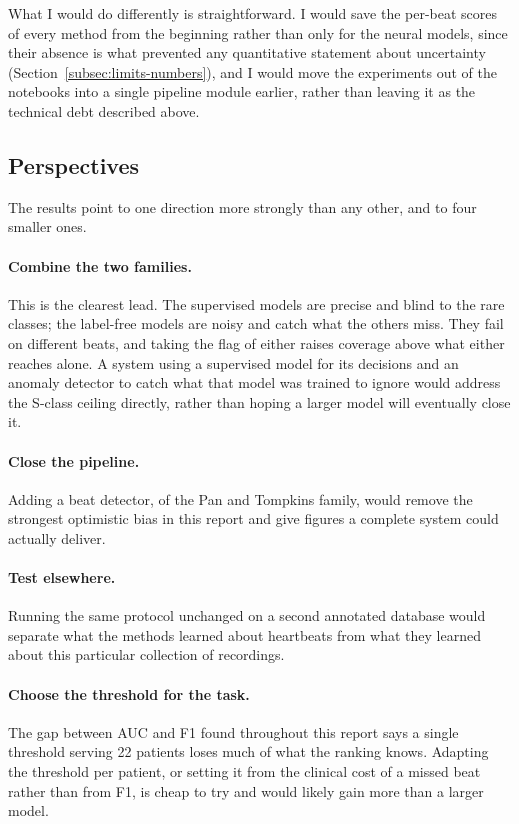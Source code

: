 \documentclass[a4paper, 12pt]{article}
\begin{document}
What I would do differently is straightforward. I would save the per-beat scores
of every method from the beginning rather than only for the neural models, since
their absence is what prevented any quantitative statement about uncertainty
(Section~\ref{subsec:limits-numbers}), and I would move the experiments out of the
notebooks into a single pipeline module earlier, rather than leaving it as the
technical debt described above.

\subsection{Perspectives} \label{subsec:perspectives}

The results point to one direction more strongly than any other, and to four
smaller ones.

\paragraph{Combine the two families.} This is the clearest lead. The supervised
models are precise and blind to the rare classes; the label-free models are noisy
and catch what the others miss. They fail on different beats, and taking the flag
of either raises coverage above what either reaches alone. A system using a
supervised model for its decisions and an anomaly detector to catch what that model
was trained to ignore would address the S-class ceiling directly, rather than
hoping a larger model will eventually close it.

\paragraph{Close the pipeline.} Adding a beat detector, of the Pan and Tompkins
family, would remove the strongest optimistic bias in this report and give figures
a complete system could actually deliver.

\paragraph{Test elsewhere.} Running the same protocol unchanged on a second
annotated database would separate what the methods learned about heartbeats from
what they learned about this particular collection of recordings.

\paragraph{Choose the threshold for the task.} The gap between AUC and F1 found
throughout this report says a single threshold serving 22 patients loses much of
what the ranking knows. Adapting the threshold per patient, or setting it from the
clinical cost of a missed beat rather than from F1, is cheap to try and would likely
gain more than a larger model.
\end{document}

